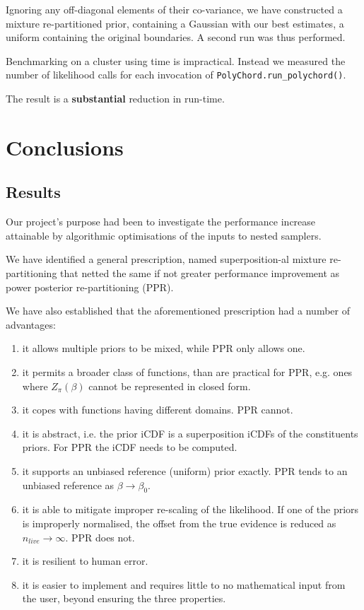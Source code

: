 \documentclass[usenatbib]{mnras}
\begin{document}
Ignoring any off-diagonal elements of their co-variance, we have
constructed a mixture re-partitioned prior, containing a Gaussian
with our best estimates, a uniform containing the original
boundaries. A second run was thus performed.

Benchmarking on a cluster using time is impractical. Instead we
measured the number of likelihood calls for each invocation of
\texttt{PolyChord.run\_polychord()}.

The result is a \textbf{substantial} reduction in run-time.




\section{Conclusions}
\label{sec:org86a3788}

\subsection{Results}
\label{sec:org158996c}
Our project's purpose had been to investigate the performance
increase attainable by algorithmic optimisations of the inputs to
nested samplers.

We have identified a general prescription, named superposition-al
mixture re-partitioning that netted the same if not greater
performance improvement as power posterior re-partitioning (PPR).

We have also established that the aforementioned prescription had a
number of advantages:
\begin{enumerate}
\item it allows multiple priors to be mixed, while PPR only allows
one.
\item it permits a broader class of functions, than are practical for
PPR, e.g. ones where \(Z_{\pi}(\beta)\) cannot be represented in
closed form.
\item it copes with functions having different domains. PPR cannot.
\item it is abstract, i.e. the prior iCDF is a superposition iCDFs of
the constituents priors. For PPR the iCDF needs to be computed.
\item it supports an unbiased reference (uniform) prior exactly. PPR
tends to an unbiased reference as \(\beta\rightarrow\beta_{0}\).
\item it is able to mitigate improper re-scaling of the likelihood. If
one of the priors is improperly normalised, the offset from the
true evidence is reduced as \(n_{live}\rightarrow\infty\). PPR
does not.
\item it is resilient to human error.
\item it is easier to implement and requires little to no mathematical
input from the user, beyond ensuring the three properties.
\end{enumerate}
\end{document}
